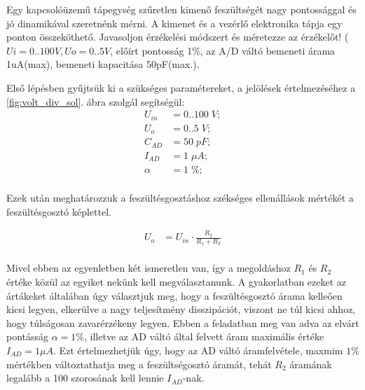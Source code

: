 \begin{example}

Egy kapcsolóüzemű tápegység szűretlen kimenő feszültségét nagy pontossággal és jó dinamikával szeretnénk mérni. A kimenet és a vezérlő elektronika tápja egy ponton összeköthető. Javasoljon érzékelési módszert és méretezze az érzékelőt! ($Ui=0..100V, Uo=0..5V$, előírt pontosság 1\%, az A/D váltó bemeneti árama 1uA(max), bemeneti kapacitása 50pF(max.).

\tcbline
\vspace{1mm}

\solution
\end{example}
Első lépésben gyűjtsük ki a szükséges paramétereket, a jelölések értelmezéséhez a \ref{fig:volt_div_sol}. ábra szolgál segítségül:
\begin{equation}
\begin{aligned}{}
    U_{in} &= 0..100\; V; \\
    U_o &= 0..5\; V; \\
    C_{AD} &= 50\; pF; \\
    I_{AD} &= 1\; \mu{}A; \\
    \alpha{} &= 1\; \%; \\
\end{aligned}
\end{equation}

Ezek után meghatározzuk a feszültésgosztáshoz székséges ellenállások mértékét a feszültésgosztó képlettel.

\begin{equation}
\begin{aligned}{}
    U_{o} &= U_{in} \cdot \frac{R_2}{R_1 + R_2} \\
\end{aligned}
\end{equation}

Mivel ebben az egyenletben két ismeretlen van, így a megoldáshoz $R_1$ és $R_2$ értéke közül az egyiket nekünk kell megválasztanunk. A gyakorlatban ezeket az ártákeket általában úgy választjuk meg, hogy a feszültésgosztó árama kelleően kicsi legyen, elkerülve a nagy teljesítmény disszipációt, viszont ne túl kicsi ahhoz, hogy túlságosan zavarérzékeny legyen. Ebben a feladatban meg van adva az elvárt pontásság $\alpha{} = 1 \%$, illetve az AD váltó által felvett áram maximális értéke $I_{AD} = 1 \mu{}A$. Ezt értelmezhetjük úgy, hogy az AD váltó áramfelvétele, maxmim $1\%$ mértékben változtathatja meg a feszültségosztó áramát, tehát $R_2$ áramának legalább a 100 szorosának kell lennie $I_{AD}$-nak.

